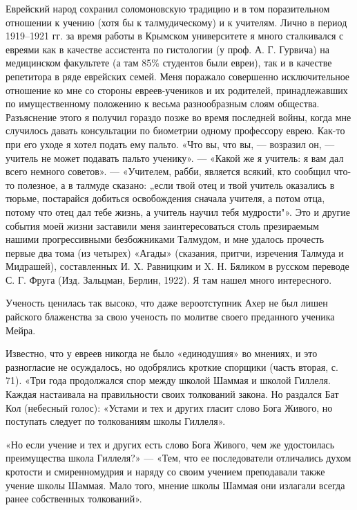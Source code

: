 Еврейский народ сохранил соломоновскую традицию и в том поразительном отношении
к учению (хотя бы к талмудическому) и к учителям. Лично в период 1919--1921 гг.
за время работы в Крымском университете я много сталкивался с евреями как в
качестве ассистента по гистологии (у проф. А. Г. Гурвича) на медицинском
факультете (а там 85\% студентов были евреи), так и в качестве репетитора в ряде
еврейских семей. Меня поражало совершенно исключительное отношение ко мне со
стороны евреев-учеников и их родителей, принадлежавших по имущественному
положению к весьма разнообразным слоям общества. Разъяснение этого я получил
гораздо позже во время последней войны, когда мне случилось давать консультации
по биометрии одному профессору еврею. Как-то при его уходе я хотел подать ему
пальто. «Что вы, что вы, --- возразил он, --- учитель не может подавать пальто
ученику». --- «Какой же я учитель: я вам дал всего немного советов». --- «Учителем,
рабби, является всякий, кто сообщил что-то полезное, а в талмуде сказано: „если
твой отец и твой учитель оказались в тюрьме, постарайся добиться освобождения
сначала учителя, а потом
отца, потому что отец дал тебе жизнь, а учитель научил тебя мудрости"». Это и
другие события моей жизни заставили меня заинтересоваться столь презираемым
нашими прогрессивными безбожниками Талмудом, и мне удалось прочесть первые два
тома (из четырех) «Агады» (сказания, притчи, изречения Талмуда и Мидрашей),
составленных И. X. Равницким и X. Н. Бяликом в русском переводе С. Г. Фруга
(Изд. Зальцман, Берлин, 1922). Я там нашел много интересного.

Ученость ценилась так высоко, что даже вероотступник Ахер не был лишен райского
блаженства за свою ученость по молитве своего преданного ученика Мейра.

Известно, что у евреев никогда не было «единодушия» во мнениях, и это
разногласие не осуждалось, но одобрялись кроткие спорщики (часть вторая, с.
71). «Три года продолжался спор между школой Шаммая и школой Гиллеля. Каждая
настаивала на правильности своих толкований закона. Но раздался Бат Кол
(небесный голос): «Устами и тех и других гласит слово Бога Живого, но поступать
следует по толкованиям школы Гиллеля».

«Но если учение и тех и других есть слово Бога Живого, чем же удостоилась
преимущества школа Гиллеля?» --- «Тем, что ее последователи отличались духом
кротости и смиренномудрия и наряду со своим учением преподавали также учение
школы Шаммая. Мало того, мнение школы Шаммая они излагали всегда ранее
собственных толкований».

